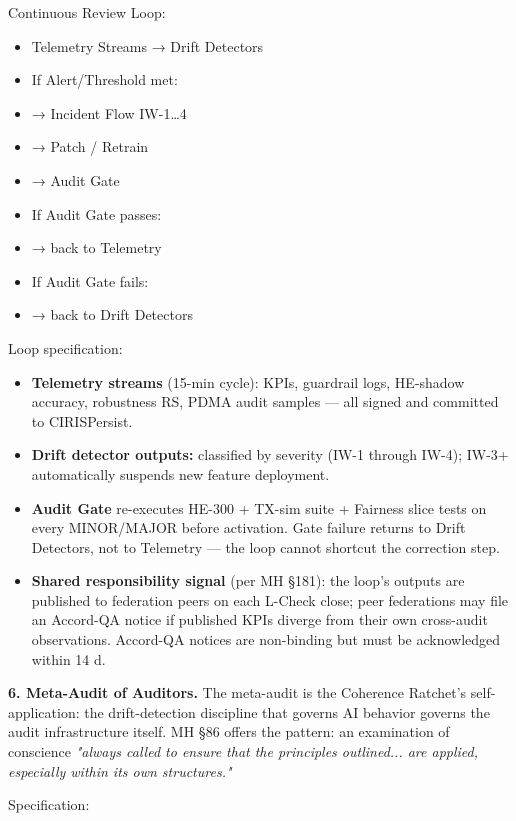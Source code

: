 \documentclass[11pt]{article}
\begin{document}
Continuous Review Loop:


\begin{itemize}\setlength\itemsep{0pt}
\item Telemetry Streams → Drift Detectors
\item If Alert/Threshold met:
\item → Incident Flow IW-1…4
\item → Patch / Retrain
\item → Audit Gate
\item If Audit Gate passes:
\item → back to Telemetry
\item If Audit Gate fails:
\item → back to Drift Detectors
\end{itemize}


Loop specification:


\begin{itemize}\setlength\itemsep{0pt}
\item \textbf{Telemetry streams} (15-min cycle): KPIs, guardrail logs, HE-shadow accuracy, robustness RS, PDMA audit samples — all signed and committed to CIRISPersist.
\item \textbf{Drift detector outputs:} classified by severity (IW-1 through IW-4); IW-3+ automatically suspends new feature deployment.
\item \textbf{Audit Gate} re-executes HE-300 + TX-sim suite + Fairness slice tests on every MINOR/MAJOR before activation. Gate failure returns to Drift Detectors, not to Telemetry — the loop cannot shortcut the correction step.
\item \textbf{Shared responsibility signal} (per MH §181): the loop's outputs are published to federation peers on each L-Check close; peer federations may file an Accord-QA notice if published KPIs diverge from their own cross-audit observations. Accord-QA notices are non-binding but must be acknowledged within 14 d.
\end{itemize}


\textbf{6. Meta-Audit of Auditors.} The meta-audit is the Coherence Ratchet's self-application: the drift-detection discipline that governs AI behavior governs the audit infrastructure itself. MH §86 offers the pattern: an examination of conscience \textit{"always called to ensure that the principles outlined... are applied, especially within its own structures."}


Specification:
\end{document}
